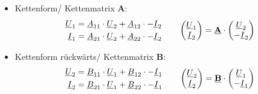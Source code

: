 \begin{itemize}[leftmargin=*]
            \item{Kettenform/ Kettenmatrix \textbf{A}:}
                \begin{align*}
                    \begin{split}
                        \underline{U}_1 &= \underline{A}_{11}\cdot\underline{U}_2 + \underline{A}_{12}\cdot-\underline{I}_2 \\
                        \underline{I}_1 &= \underline{A}_{21}\cdot\underline{U}_2 + \underline{A}_{22}\cdot-\underline{I}_2
                    \end{split}
	               \qquad
                    \begin{pmatrix}
                        \underline{U}_1 \\
                        \underline{I}_2
                    \end{pmatrix} = \textbf{\underline{A}}\cdot
                    \begin{pmatrix}
                        \underline{U}_2 \\
                        -\underline{I}_2
                    \end{pmatrix}
                \end{align*}
                \item{Kettenform rückwärts/ Kettenmatrix \textbf{B}:}
                    \begin{align*}
                        \begin{split}
                            \underline{U}_2 &= \underline{B}_{11}\cdot\underline{U}_1 + \underline{B}_{12}\cdot-\underline{I}_1\\
                            \underline{I}_2 &= \underline{B}_{21}\cdot\underline{U}_1 + \underline{B}_{22}\cdot-\underline{I}_1
                        \end{split}
                    \qquad
                    \begin{pmatrix}
                        \underline{U}_2\\
                        \underline{I}_2
                    \end{pmatrix} = \textbf{\underline{B}}\cdot
                    \begin{pmatrix}
                        \underline{U}_1 \\
                        -\underline{I}_1
                    \end{pmatrix}
                    \end{align*}
    \end{itemize}
   \normalsize
